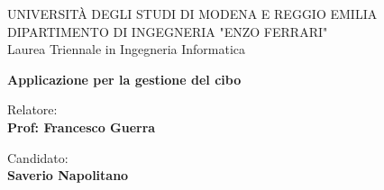 \begin{titlepage}
    \begin{figure}[!htb]
        \centering
    \end{figure}
    \vspace{30mm}
    \begin{center}
        \LARGE{UNIVERSITÀ DEGLI STUDI DI MODENA E REGGIO EMILIA}
        \vspace{5mm}
        \\ \large{DIPARTIMENTO DI INGEGNERIA "ENZO FERRARI"}
        \vspace{5mm}
        \\ Laurea Triennale in Ingegneria Informatica
    \end{center}
    
    \vspace{15mm}
    \begin{center}
        {\LARGE{\bf Applicazione per la gestione del cibo}}
        
        
    \end{center}
    \vspace{30mm}
    
    \begin{minipage}[t]{0.47\textwidth}
      {\large{Relatore:}{\normalsize\vspace{3mm}
      \bf\\ \large{Prof: Francesco Guerra} \normalsize\vspace{3mm}\bf}}
    \end{minipage}
    \hfill
    \begin{minipage}[t]{0.47\textwidth}\raggedleft
      {\large{Candidato:}{\normalsize\vspace{3mm} \bf\\ \large{Saverio Napolitano}}}
    \end{minipage}
    
    \vspace{30mm}
    \hrulefill
    \\
    
    \end{titlepage}